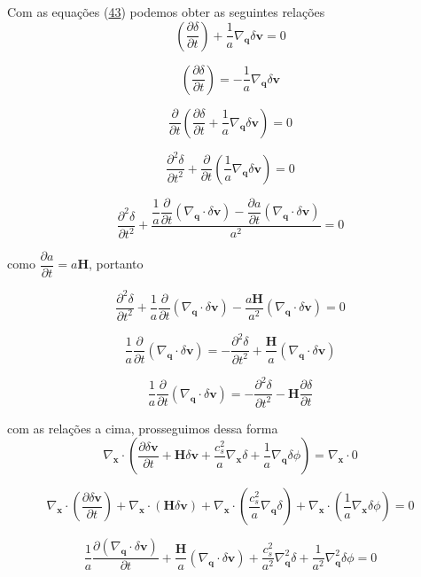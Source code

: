 \documentclass[a4paper,12pt]{article}
\begin{document}
Com as equações (\hyperref[eq43]{43}) podemos obter as seguintes relações
$$\left( \dfrac{\partial \delta}{\partial t} \right) + \dfrac{1}{a}\nabla_\mathbf{q}\delta\mathbf{v} = 0$$

$$\left( \dfrac{\partial \delta}{\partial t} \right)   = -\dfrac{1}{a}\nabla_\mathbf{q}\delta\mathbf{v}$$
\newline

$$\dfrac{\partial}{\partial t}\left( \dfrac{\partial \delta}{\partial t}  + \dfrac{1}{a}\nabla_\mathbf{q}\delta\mathbf{v} \right)= 0$$

$$\dfrac{\partial^2 \delta}{\partial t^2} + \dfrac{\partial}{\partial t}\left( \dfrac{1}{a}\nabla_\mathbf{q}\delta\mathbf{v} \right)= 0$$

$$\dfrac{\partial^2 \delta}{\partial t^2} + \dfrac{ \dfrac{1}{a}\dfrac{\partial}{\partial t }(\nabla_\mathbf{q}\cdot\delta\mathbf{v})- \dfrac{\partial a}{\partial t}(\nabla_\mathbf{q}\cdot\delta\mathbf{v})}{a^2} = 0$$

como $\dfrac{\partial a}{\partial t}=a\mathbf{H}$, portanto

$$\dfrac{\partial^2 \delta}{\partial t^2} +  \dfrac{1}{a}\dfrac{\partial}{\partial t }(\nabla_\mathbf{q}\cdot\delta\mathbf{v})-  \dfrac{a\mathbf{H}}{a^2}(\nabla_\mathbf{q}\cdot\delta\mathbf{v}) = 0$$

$$\dfrac{1}{a}\dfrac{\partial}{\partial t }(\nabla_\mathbf{q}\cdot\delta\mathbf{v})= -\dfrac{\partial^2 \delta}{\partial t^2} + \dfrac{\mathbf{H}}{a}(\nabla_\mathbf{q}\cdot\delta\mathbf{v})$$

$$\dfrac{1}{a}\dfrac{\partial}{\partial t }(\nabla_\mathbf{q}\cdot\delta\mathbf{v})= -\dfrac{\partial^2 \delta}{\partial t^2} -\mathbf{H} \dfrac{\partial\delta}{\partial t}$$

com as relações a cima, prosseguimos dessa forma
$$\nabla_\mathbf{x}\cdot\left( \dfrac{\partial \delta\mathbf{v}}{\partial t}  +\mathbf{H}\delta\mathbf{v}+\dfrac{c^2_s}{a}\nabla_\mathbf{x}\delta + \dfrac{1}{a}\nabla_\mathbf{q}\delta\phi \right)=\nabla_\mathbf{x}\cdot0$$

$$\nabla_\mathbf{x}\cdot\left( \dfrac{\partial \delta\mathbf{v}}{\partial t}  \right)+\nabla_\mathbf{x}\cdot\left( \mathbf{H}\delta\mathbf{v}\right)+\nabla_\mathbf{x}\cdot\left( \dfrac{c^2_s}{a}\nabla_\mathbf{q}\delta\right)+\nabla_\mathbf{x}\cdot\left(  \dfrac{1}{a}\nabla_\mathbf{x}\delta\phi \right)=0$$

$$\dfrac{1}{a}\dfrac{\partial (\nabla_\mathbf{q}\cdot\delta\mathbf{v})}{\partial t}  + \dfrac{\mathbf{H}}{a}(\nabla_\mathbf{q}\cdot\delta\mathbf{v}) + \dfrac{c^2_s}{a^2}\nabla^2_\mathbf{q}\delta+ \dfrac{1}{a^2}\nabla^2_\mathbf{q}\delta\phi =0$$
\end{document}
